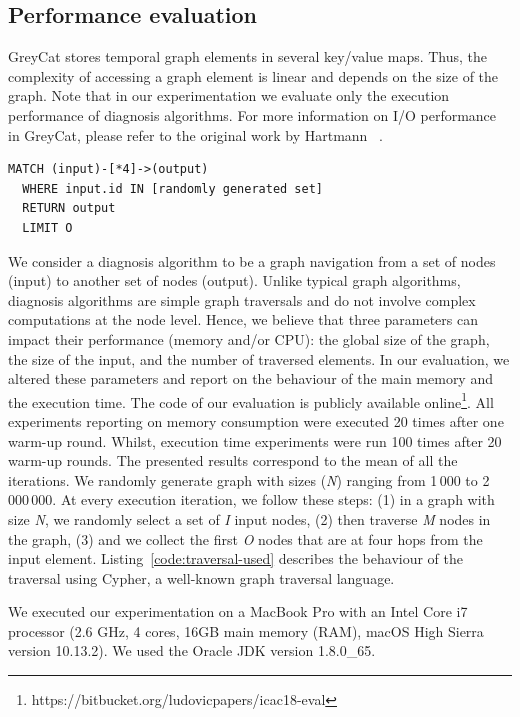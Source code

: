 \subsection{Performance evaluation}
GreyCat stores temporal graph elements in several key/value maps. Thus, the complexity of accessing a graph element is linear and depends on the size of the graph. 
Note that in our experimentation we evaluate only the execution performance of diagnosis algorithms. For more information on I/O performance in GreyCat, please refer to the original work by Hartmann \etal~\cite{DBLP:conf/seke/0001FJRT17, DBLP:phd/basesearch/Hartmann16}.

\begin{lstlisting}[style=customc,caption=Traversal used during the experimentations,label=code:traversal-used,basicstyle=\scriptsize]
  MATCH (input)-[*4]->(output)
  WHERE input.id IN [randomly generated set]
  RETURN output
  LIMIT O
\end{lstlisting}

We consider a diagnosis algorithm to be a graph navigation from a set of nodes (input) to another set of nodes (output).
Unlike typical graph algorithms, diagnosis algorithms are simple graph traversals and do not involve complex computations at the node level. Hence, we believe that three parameters can impact their performance (memory and/or CPU): the global size of the graph, the size of the input, and the number of traversed elements.
In our evaluation, we altered these parameters and report on the behaviour of the main memory and the execution time. The code of our evaluation is publicly available online\footnote{https://bitbucket.org/ludovicpapers/icac18-eval}.
All experiments reporting on memory consumption were executed 20 times after one warm-up round. Whilst, execution time experiments were run 100 times after 20 warm-up rounds.
The presented results correspond to the mean of all the iterations.
We randomly generate graph with sizes (\textit{N}) ranging from 1\,000 to 2\,000\,000. 
At every execution iteration, we follow these steps: (1) in a graph with size \textit{N}, we randomly select a set of \textit{I} input nodes, (2) then traverse \textit{M} nodes in the graph, (3) and  we collect  the first \textit{O} nodes that are at four hops from the input element. Listing~\ref{code:traversal-used} describes the behaviour of the traversal using Cypher, a well-known graph traversal language.

We executed our experimentation on a MacBook Pro with an Intel Core i7 processor (2.6 GHz, 4 cores, 16GB main memory (RAM), macOS High Sierra version 10.13.2). We used the Oracle JDK version 1.8.0\_65.

